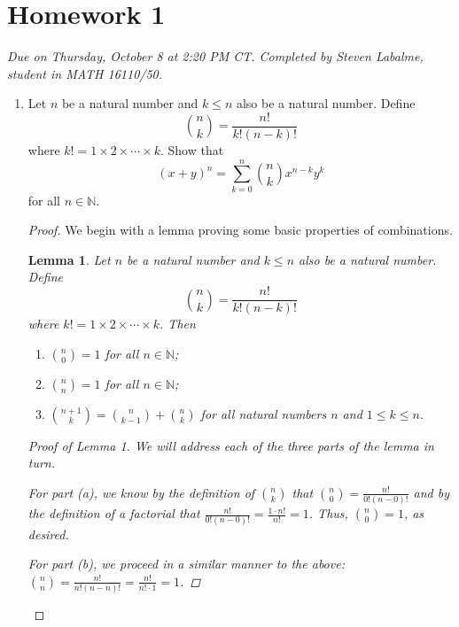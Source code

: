 \documentclass[titlepage]{article}
\newtheorem{lemma}{Lemma}
\theoremstyle{definition}
\newcommand{\N}{\mathbb{N}}
\begin{document}
\section{Homework 1}
\setcounter{secnumdepth}{3}
\emph{Due on Thursday, October 8 at 2:20 PM CT. Completed by Steven Labalme, student in MATH 16110/50.}
\begin{enumerate}
    \item Let $n$ be a natural number and $k\leq n$ also be a natural number. Define
    \begin{equation*}
        \binom{n}{k} = \frac{n!}{k!(n-k)!}
    \end{equation*}
    where $k!=1\times 2\times\cdots\times k$. Show that
    \begin{equation*}
        (x+y)^n = \sum_{k=0}^n\binom{n}{k}x^{n-k}y^k
    \end{equation*}
    for all $n\in\N$.\par
    \begin{proof}
        We begin with a lemma proving some basic properties of combinations.
        \setcounter{lemma}{0}
        \begin{lemma}
            Let $n$ be a natural number and $k\leq n$ also be a natural number. Define
            \begin{equation*}
                \binom{n}{k} = \frac{n!}{k!(n-k)!}
            \end{equation*}
            where $k!=1\times 2\times\cdots\times k$. Then
            \begin{enumerate}[label={\alph*\textup{)}}]
                \item $\binom{n}{0}=1$ for all $n\in\N$;
                \item $\binom{n}{n}=1$ for all $n\in\N$;
                \item $\binom{n+1}{k}=\binom{n}{k-1}+\binom{n}{k}$ for all natural numbers $n$ and $1\leq k\leq n$.
            \end{enumerate}
            \begin{proof}[Proof of Lemma 1]
                We will address each of the three parts of the lemma in turn.\par
                For part (a), we know by the definition of $\binom{n}{k}$ that $\binom{n}{0}=\frac{n!}{0!(n-0)!}$ and by the definition of a factorial that $\frac{n!}{0!(n-0)!}=\frac{1\cdot n!}{n!}=1$. Thus, $\binom{n}{0}=1$, as desired.\par
                For part (b), we proceed in a similar manner to the above: $\binom{n}{n}=\frac{n!}{n!(n-n)!}=\frac{n!}{n!\cdot 1}=1$.\par

\end{proof}
\end{lemma}
\end{proof}
\end{enumerate}
\end{document}
